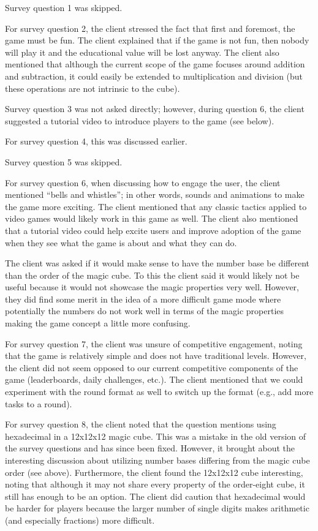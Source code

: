 \documentclass{article}
\begin{document}
Survey question 1 was skipped.

For survey question 2, the client stressed the fact that first and foremost, the game must be fun. The client explained that if the game is not fun, then nobody will play it and the educational value will be lost anyway. The client also mentioned that although the current scope of the game focuses around addition and subtraction, it could easily be extended to multiplication and division (but these operations are not intrinsic to the cube).

Survey question 3 was not asked directly; however, during question 6, the client suggested a tutorial video to introduce players to the game (see below).

For survey question 4, this was discussed earlier.

Survey question 5 was skipped.

For survey question 6, when discussing how to engage the user, the client mentioned ``bells and whistles''; in other words, sounds and animations to make the game more exciting. The client mentioned that any classic tactics applied to video games would likely work in this game as well. The client also mentioned that a tutorial video could help excite users and improve adoption of the game when they see what the game is about and what they can do.

The client was asked if it would make sense to have the number base be different than the order of the magic cube. To this the client said it would likely not be useful because it would not showcase the magic properties very well. However, they did find some merit in the idea of a more difficult game mode where potentially the numbers do not work well in terms of the magic properties making the game concept a little more confusing.

For survey question 7, the client was unsure of competitive engagement, noting that the game is relatively simple and does not have traditional levels. However, the client did not seem opposed to our current competitive components of the game (leaderboards, daily challenges, etc.). The client mentioned that we could experiment with the round format as well to switch up the format (e.g., add more tasks to a round).

For survey question 8, the client noted that the question mentions using hexadecimal in a 12x12x12 magic cube. This was a mistake in the old version of the survey questions and has since been fixed. However, it brought about the interesting discussion about utilizing number bases differing from the magic cube order (see above). Furthermore, the client found the 12x12x12 cube interesting, noting that although it may not share every property of the order-eight cube, it still has enough to be an option. The client did caution that hexadecimal would be harder for players because the larger number of single digits makes arithmetic (and especially fractions) more difficult.
\end{document}
